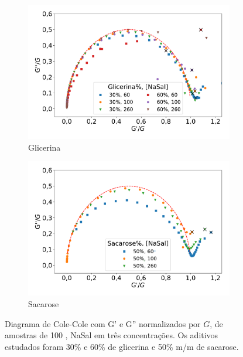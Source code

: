 		\begin{figure}[h]
			\begin{subfigure}[t]{0.5\textwidth}
				\centering
				\includegraphics[width=\textwidth]{imagens/reologia/colecole_glicerina}
				\caption{Glicerina}
				\label{fig:colecole_glicerina}
			\end{subfigure} %
			\begin{subfigure}[t]{0.5\textwidth}
				\centering
				\includegraphics[width=\textwidth]{imagens/reologia/colecole_sacarose}
				\caption{Sacarose}
				\label{fig:colecole_sacarose}
			\end{subfigure} %
			\caption{Diagrama de Cole-Cole com G' e G'' normalizados por \(G\), de amostras de \CTAB{} 100 \mM{}, NaSal em três concentrações. Os aditivos estudados foram 30\% e 60\% de glicerina e 50\% m/m de sacarose.}
			\label{fig:colecole_glicerina_sacarose}
		\end{figure}
		
